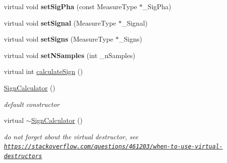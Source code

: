 \begin{DoxyCompactItemize}
\item 
\hypertarget{class_ox_1_1_sign_calculator_a1fe78e188915e35e8d0db885642852c9}{virtual void {\bfseries set\-Sig\-Pha} (const Measure\-Type $\ast$\-\_\-\-Sig\-Pha)}\label{class_ox_1_1_sign_calculator_a1fe78e188915e35e8d0db885642852c9}

\item 
\hypertarget{class_ox_1_1_sign_calculator_ade6aa249b05f92357cb825065be8a203}{virtual void {\bfseries set\-Signal} (Measure\-Type $\ast$\-\_\-\-Signal)}\label{class_ox_1_1_sign_calculator_ade6aa249b05f92357cb825065be8a203}

\item 
\hypertarget{class_ox_1_1_sign_calculator_a3de14f899f64c93df9076fb837e553bf}{virtual void {\bfseries set\-Signs} (Measure\-Type $\ast$\-\_\-\-Signs)}\label{class_ox_1_1_sign_calculator_a3de14f899f64c93df9076fb837e553bf}

\item 
\hypertarget{class_ox_1_1_sign_calculator_a8a4f3f8b94fad53d444cf6f1c1191497}{virtual void {\bfseries set\-N\-Samples} (int \-\_\-n\-Samples)}\label{class_ox_1_1_sign_calculator_a8a4f3f8b94fad53d444cf6f1c1191497}

\item 
virtual int \hyperlink{class_ox_1_1_sign_calculator_ab7f0a44979db34b15a78a8b755f6c103}{calculate\-Sign} ()
\item 
\hypertarget{class_ox_1_1_sign_calculator_a1b0a177a5f2c6080d6730ff5fdc384af}{\hyperlink{class_ox_1_1_sign_calculator_a1b0a177a5f2c6080d6730ff5fdc384af}{Sign\-Calculator} ()}\label{class_ox_1_1_sign_calculator_a1b0a177a5f2c6080d6730ff5fdc384af}

\begin{DoxyCompactList}\small\item\em default constructor \end{DoxyCompactList}\item 
\hypertarget{class_ox_1_1_sign_calculator_a5143a172e360633d8df758756d146889}{virtual \hyperlink{class_ox_1_1_sign_calculator_a5143a172e360633d8df758756d146889}{$\sim$\-Sign\-Calculator} ()}\label{class_ox_1_1_sign_calculator_a5143a172e360633d8df758756d146889}

\begin{DoxyCompactList}\small\item\em do not forget about the virtual destructor, see \href{https://stackoverflow.com/questions/461203/when-to-use-virtual-destructors}{\tt https\-://stackoverflow.\-com/questions/461203/when-\/to-\/use-\/virtual-\/destructors} \end{DoxyCompactList}\end{DoxyCompactItemize}
